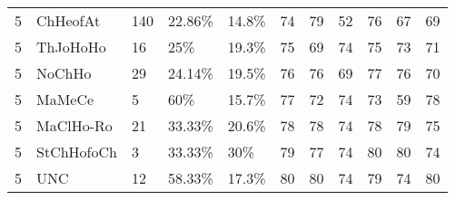\begin{longtable}{lllllrrrrrr}
  5 & ChHeofAt & 140 & 22.86\% & 14.8\% &  74 &  79 &  52 &  76 &  67 &  69 \\ 
  5 & ThJoHoHo & 16 & 25\% & 19.3\% &  75 &  69 &  74 &  75 &  73 &  71 \\ 
  5 & NoChHo & 29 & 24.14\% & 19.5\% &  76 &  76 &  69 &  77 &  76 &  70 \\ 
  5 & MaMeCe & 5 & 60\% & 15.7\% &  77 &  72 &  74 &  73 &  59 &  78 \\ 
  5 & MaClHo-Ro & 21 & 33.33\% & 20.6\% &  78 &  78 &  74 &  78 &  79 &  75 \\ 
  5 & StChHofoCh & 3 & 33.33\% & 30\% &  79 &  77 &  74 &  80 &  80 &  74 \\ 
  5 & UNC & 12 & 58.33\% & 17.3\% &  80 &  80 &  74 &  79 &  74 &  80 \\ 
   \hline
\hline
\end{longtable}
